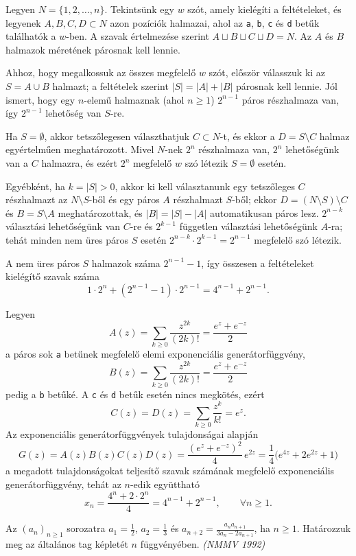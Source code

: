 \begin{solution}
Legyen $N=\{1,2,\ldots,n\}$. Tekintsünk egy $w$ szót, amely kielégíti
a feltételeket, és legyenek $A,B,C,D\subset N$ azon pozíciók halmazai,
ahol az \texttt{a}, \texttt{b}, \texttt{c} és \texttt{d} betűk találhatók
a $w$-ben. A szavak értelmezése szerint $A\sqcup B\sqcup C\sqcup D=N$.
Az $A$ és $B$ halmazok méretének párosnak kell lennie.

Ahhoz, hogy megalkossuk az összes megfelelő $w$ szót, először válasszuk
ki az $S=A\cup B$ halmazt; a feltételek szerint $|S|=|A|+|B|$ párosnak
kell lennie. Jól ismert, hogy egy $n$-elemű halmaznak (ahol $n\ge1$)
$2^{n-1}$ páros részhalmaza van, így $2^{n-1}$ lehetőség van $S$-re.

Ha $S=\emptyset$, akkor tetszőlegesen választhatjuk $C\subset N$-t,
és ekkor a $D=S\setminus C$ halmaz egyértelműen meghatározott. Mivel
$N$-nek $2^{n}$ részhalmaza van, $2^{n}$ lehetőségünk van a $C$
halmazra, és ezért $2^{n}$ megfelelő $w$ szó létezik $S=\emptyset$
esetén.

Egyébként, ha $k=|S|>0$, akkor ki kell választanunk egy tetszőleges
$C$ részhalmazt az $N\setminus S$-ből és egy páros $A$ részhalmazt
$S$-ből; ekkor $D=(N\setminus S)\setminus C$ és $B=S\setminus A$
meghatározottak, és $|B|=|S|-|A|$ automatikusan páros lesz. $2^{n-k}$
választási lehetőségünk van $C$-re és $2^{k-1}$ független választási
lehetőségünk $A$-ra; tehát minden nem üres páros $S$ esetén $2^{n-k}\cdot2^{k-1}=2^{n-1}$
megfelelő szó létezik.

A nem üres páros $S$ halmazok száma $2^{n-1}-1$, így összesen a
feltételeket kielégítő szavak száma 
\[
1\cdot2^{n}+(2^{n-1}-1)\cdot2^{n-1}=4^{n-1}+2^{n-1}.
\]

Legyen 
\[
A(z)=\sum_{k\ge0}\frac{z^{2k}}{(2k)!}=\frac{e^{z}+e^{-z}}{2}
\]
a páros sok \texttt{a} betűnek megfelelő elemi exponenciális generátorfüggvény,
\[
B(z)=\sum_{k\ge0}\frac{z^{2k}}{(2k)!}=\frac{e^{z}+e^{-z}}{2}
\]
pedig a \texttt{b} betűké. A \texttt{c} és \texttt{d} betűk esetén
nincs megkötés, ezért 
\[
C(z)=D(z)=\sum_{k\ge0}\frac{z^{k}}{k!}=e^{z}.
\]
Az exponenciális generátorfüggvények tulajdonságai alapján 
\[
G(z)=A(z)B(z)C(z)D(z)=\frac{(e^{z}+e^{-z})^{2}}{4}\,e^{2z}=\frac{1}{4}\bigl(e^{4z}+2e^{2z}+1\bigr)
\]
a megadott tulajdonságokat teljesítő szavak számának megfelelő exponenciális
generátorfüggvény, tehát az $n$-edik együttható 
\[
x_{n}=\frac{4^{n}+2\cdot2^{n}}{4}=4^{n-1}+2^{n-1},\qquad\forall n\ge1.
\]
\end{solution}
\begin{extraproblem}
Az $(a_{n})_{n\geq1}$ sorozatra $a_{1}=\frac{1}{2}$, $a_{2}=\frac{1}{3}$
és $a_{n+2}=\frac{a_{n}a_{n+1}}{3a_{n}-2a_{n+1}}$, ha $n\geq1$.
Határozzuk meg az általános tag képletét $n$ függvényében. \emph{(NMMV
1992) }
\end{extraproblem}


